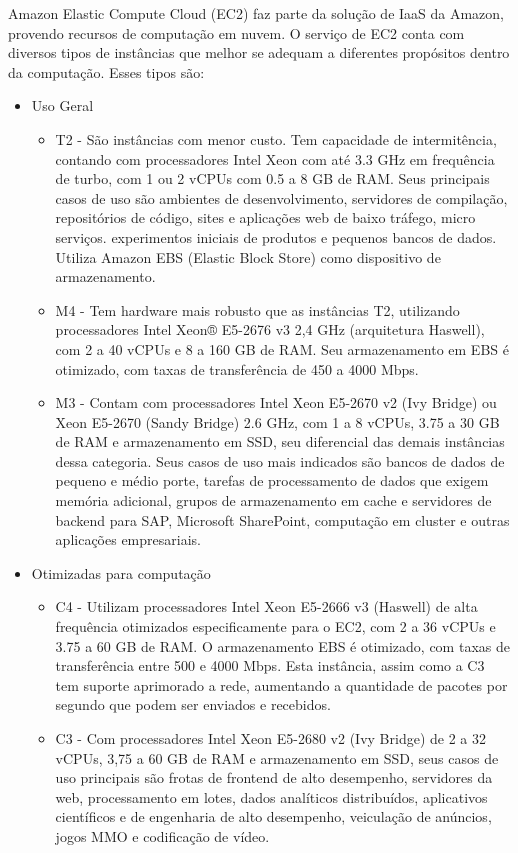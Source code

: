 \documentclass[tg]{mdtufsm}
\begin{document}
Amazon Elastic Compute Cloud (EC2) faz parte da solução de IaaS da Amazon, provendo recursos de computação em nuvem. O serviço de EC2 conta com diversos tipos de instâncias que melhor se adequam a diferentes propósitos dentro da computação. Esses tipos são:

\begin{itemize}
\item Uso Geral
	\begin{itemize}
	\item T2 - São instâncias com menor custo. Tem capacidade de intermitência, contando com processadores Intel Xeon com até 3.3 GHz em frequência de turbo, com 1 ou 2 vCPUs com 0.5 a 8 GB de RAM. Seus principais casos de uso são ambientes de desenvolvimento, servidores de compilação, repositórios de código, sites e aplicações web de baixo tráfego, micro serviços. experimentos iniciais de produtos e pequenos bancos de dados. Utiliza Amazon EBS (Elastic Block Store) como dispositivo de armazenamento.
	\item M4 - Tem hardware mais robusto que as instâncias T2, utilizando processadores Intel Xeon® E5-2676 v3 2,4 GHz (arquitetura Haswell), com 2 a 40 vCPUs e 8 a 160 GB de RAM. Seu armazenamento em EBS é otimizado, com taxas de transferência de 450 a 4000 Mbps.
	\item M3 - Contam com processadores Intel Xeon E5-2670 v2 (Ivy Bridge) ou Xeon E5-2670 (Sandy Bridge) 2.6 GHz, com 1 a 8 vCPUs, 3.75 a 30 GB de RAM e armazenamento em SSD, seu diferencial das demais instâncias dessa categoria. Seus casos de uso mais indicados são bancos de dados de pequeno e médio porte, tarefas de processamento de dados que exigem memória adicional, grupos de armazenamento em cache e servidores de backend para SAP, Microsoft SharePoint, computação em cluster e outras aplicações empresariais.
	\end{itemize}
\item Otimizadas para computação
	\begin{itemize}
	\item C4 - Utilizam processadores Intel Xeon E5-2666 v3 (Haswell) de alta frequência otimizados especificamente para o EC2, com 2 a 36 vCPUs e 3.75 a 60 GB de RAM. O armazenamento EBS é otimizado, com taxas de transferência entre 500 e 4000 Mbps. Esta instância, assim como a C3 tem suporte aprimorado a rede, aumentando a quantidade de pacotes por segundo que podem ser enviados e recebidos.
	\item C3 - Com processadores Intel Xeon E5-2680 v2 (Ivy Bridge) de 2 a 32 vCPUs, 3,75 a 60 GB de RAM e armazenamento em SSD, seus casos de uso principais são frotas de frontend de alto desempenho, servidores da web, processamento em lotes, dados analíticos distribuídos, aplicativos científicos e de engenharia de alto desempenho, veiculação de anúncios, jogos MMO e codificação de vídeo.

\end{itemize}
\end{itemize}
\end{document}
